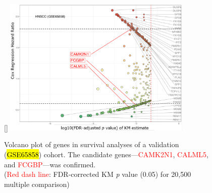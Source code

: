 \documentclass[
paper=landscape,
paper=160mm:90mm, %
fontsize=11pt, %
pagesize, %
parskip=half-, %
]{scrartcl} %
\theoremstyle{mythmstyle} %
\begin{document}
%
\clearpage

\thispagestyle{headings}

\begin{figure}[ht]
[\FBwidth]
{    \includegraphics[width=9cm]{Rplot_GSE65858_CoxHR_CAMK2N1_top3FDRKM.pdf}}
{\captionsetup{labelformat=empty}    \caption{Volcano plot of genes in survival analyses of a validation (\hl{GSE65858}) cohort.
The candidate genes---\textcolor{red}{CAMK2N1}, \textcolor{red}{CALML5}, and \textcolor{red}{FCGBP}---was confirmed.\\
    (\textcolor{red}{Red dash line}: FDR-corrected KM \textit{p} value (0.05) for 20,500 multiple comparison)
    }}
\end{figure}



\clearpage
%
\thispagestyle{headings}
\end{document}
